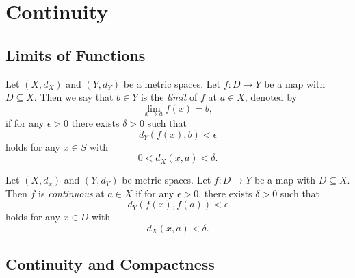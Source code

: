 \chapter{Continuity}
\section{Limits of Functions}
\begin{definition}
  Let $(X, d_X)$ and $(Y, d_Y)$ be a metric spaces.
  Let $f: D \to Y$ be a map with $D \subseteq X$.
  Then we say that $b \in Y$ is the \emph{limit} of $f$ at $a \in X$, denoted
  by
  \begin{equation*}
    \lim_{x \to a} f(x) = b,
  \end{equation*}
  if for any $\epsilon > 0$ there exists $\delta > 0$ such that
  \begin{equation*}
    d_Y(f(x), b) < \epsilon
  \end{equation*}
  holds for any $x \in S$ with
  \begin{equation*}
    0 < d_X(x, a) < \delta.
  \end{equation*}
\end{definition}

\begin{definition}
  Let $(X, d_x)$ and $(Y, d_Y)$ be metric spaces.
  Let $f: D \to Y$ be a map with $D \subseteq X$.
  Then $f$ is \emph{continuous} at $a \in X$ if for any $\epsilon > 0$, there
  exists $\delta > 0$ such that
  \begin{equation*}
    d_Y(f(x), f(a)) < \epsilon
  \end{equation*}
  holds for any $x \in D$ with
  \begin{equation*}
    d_X(x, a) < \delta.
  \end{equation*}
\end{definition}

\section{Continuity and Compactness}